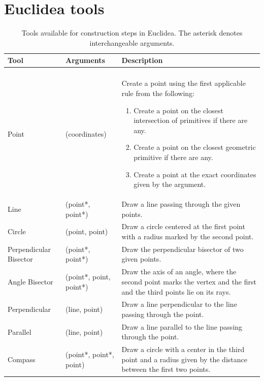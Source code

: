 \section{Euclidea tools}
\begin{table}[!htb]
\begin{center}
 \setlength{\tabcolsep}{4pt}
 \begin{tabular}{ p{2.4cm} | p{3.2cm} | p{6.7cm} } 
 Tool & Arguments & Description \\
 \hline
 \newline &  &  \\
 Point &
 (coordinates) &
 Create a point using the first applicable rule from the following:
\begin{enumerate}
  \item Create a point on the closest intersection of primitives if there are any.
  \item Create a point on the closest geometric primitive if there are any.
  \item Create a point at the exact coordinates given by the argument.
\end{enumerate} \\
 Line &
 (point*, point*) &
 Draw a line passing through the given points.
 \newline \\
 Circle &
 (point, point) &
 Draw a circle centered at the first point with a radius marked by the second point.
 \newline \\
 Perpendicular Bisector &
 (point*, point*) &
 Draw the perpendicular bisector of two given points.%
 \newline \\
 Angle Bisector &
 (point*, point, point*) &
 Draw the axis of an angle, where the second point marks the vertex and the first and the third points lie on its rays. 
 \newline \\
 Perpendicular &
 (line, point) &
 Draw a line perpendicular to the line passing through the point.
 \newline \\
 Parallel &
 (line, point) &
 Draw a line parallel to the line passing through the point.
 \newline \\
 Compass &
 (point*, point*, point) &
 Draw a circle with a center in the third point and a radius given by the distance between the first two points. \\
\end{tabular}
\caption{Tools available for construction steps in Euclidea.
The asterisk denotes interchangeable arguments.}
\label{tab:description_of_tools}
\end{center}

\end{table}
\newpage
